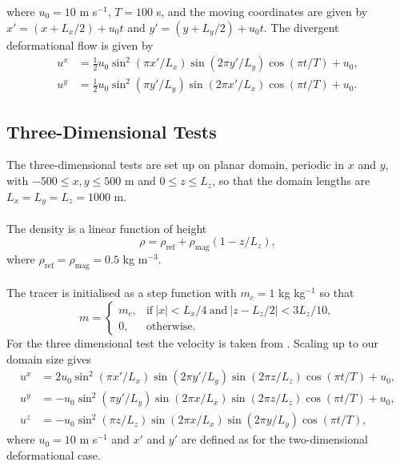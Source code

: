 \documentclass[11pt,a4paper]{article}
\begin{document}
where $u_0=10$ m s$^{-1}$, $T=100$ s, and the moving coordinates are given by $x' = (x+L_x/2) + u_0 t$ and $y' = (y+L_y/2) + u_0 t$. The divergent deformational flow is given by
\begin{subequations}
\begin{align}
u^x & =  \tfrac{1}{2}u_0 \sin^2(\pi x'/L_x)\sin(2 \pi y'/L_y)\cos(\pi t/T)+u_0,\\ 
u^y & = \tfrac{1}{2}u_0 \sin^2(\pi y'/L_y)\sin(2 \pi x'/L_x)\cos(\pi t/T)+u_0.
\end{align}
\end{subequations}

\subsection{Three-Dimensional Tests}

The three-dimensional tests are set up on planar domain, periodic in $x$ and $y$, with $-500 \leq x,y \leq 500$ m and $0 \leq z \leq L_z$, so that the domain lengths are $L_x=L_y=L_z=1000$ m. \\
\\
The density is a linear function of height
\begin{equation}
    \rho = \rho_{\mathrm{ref}} + \rho_{\mathrm{mag}}(1-z/L_z),
\end{equation}
where $ \rho_{\mathrm{ref}}=\rho_{\mathrm{mag}} = 0.5$ kg m$^{-3}$.  \\
\\
The tracer is initialised as a step function with $m_c=1$ kg kg$^{-1}$ so that
\begin{equation}
    m = 
    \begin{cases}
        m_c, & \mathrm{if} \ |x| < L_x/4 \ \mathrm{and} \ |z-L_z/2|< 3L_z/10, \\
        0, & \mathrm{otherwise}.
    \end{cases}
\end{equation}
For the three dimensional test the velocity is taken from \cite{skamarock2006limiters}. Scaling up to our domain size gives
\begin{subequations}
\begin{align}
u^x & =  2 u_0 \sin^2(\pi x'/L_x)\sin(2 \pi y'/L_y)\sin(2 \pi z/L_z)\cos(\pi t/T)+u_0,\\ 
u^y & = -u_0 \sin^2(\pi y'/L_y)\sin(2 \pi x/L_x)\sin(2 \pi z/L_z)\cos(\pi t/T)+u_0,\\ 
u^z & = -u_0 \sin^2(\pi z/L_z)\sin(2 \pi x/L_x)\sin(2 \pi y/L_y)\cos(\pi t/T),
\end{align}
\end{subequations}
where $u_0=10$ m s$^{-1}$ and $x'$ and $y'$ are defined as for the two-dimensional deformational case. 



\end{document}
